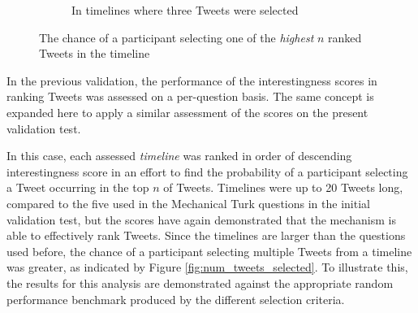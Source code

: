 \begin{figure}[h]
\begin{subfigure}{.5\textwidth}
    \centering
    \caption{In timelines where three Tweets were selected}
    \label{fig:rank-three}
\end{subfigure}
\caption{The chance of a participant selecting one of the \textit{highest} $n$ ranked Tweets in the timeline}
\end{figure}

In the previous validation, the performance of the interestingness scores in ranking Tweets was assessed on a per-question basis. The same concept is expanded here to apply a similar assessment of the scores on the present validation test.

In this case, each assessed \textit{timeline} was ranked in order of descending interestingness score in an effort to find the probability of a participant selecting a Tweet occurring in the top $n$ of Tweets. Timelines were up to 20 Tweets long, compared to the five used in the Mechanical Turk questions in the initial validation test, but the scores have again demonstrated that the mechanism is able to effectively rank Tweets. Since the timelines are larger than the questions used before, the chance of a participant selecting multiple Tweets from a timeline was greater, as indicated by Figure \ref{fig:num_tweets_selected}. To illustrate this, the results for this analysis are demonstrated against the appropriate random performance benchmark produced by the different selection criteria.

